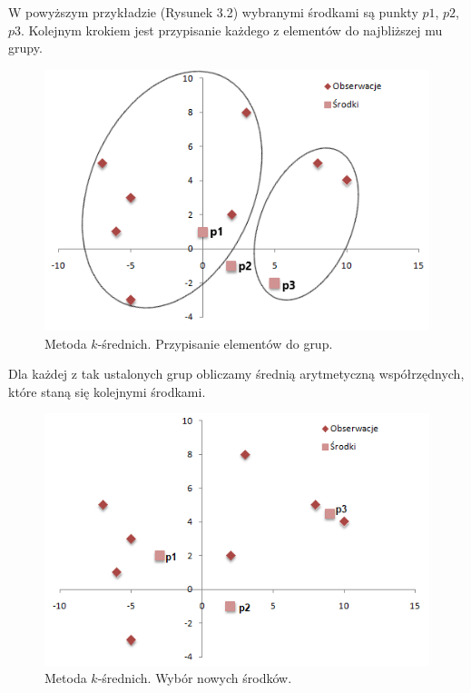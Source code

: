 \documentclass[12pt,a4paper]{report}
\begin{document}
W powyższym przykładzie (Rysunek 3.2) wybranymi środkami są punkty $p1$, $p2$, $p3$. Kolejnym krokiem jest przypisanie każdego z elementów do najbliższej mu grupy.
\begin{center}
\begin{figure}[H]
\centering
\includegraphics[scale=0.8]{ks_1.png} 
\caption{Metoda $k$-średnich. Przypisanie elementów do grup.}
\end{figure}
\end{center}
Dla każdej z tak ustalonych grup obliczamy średnią arytmetyczną współrzędnych, które staną się kolejnymi środkami.
\begin{center}
\begin{figure}[H]
\centering
\includegraphics[scale=0.8]{ks_2.png} 
\caption{Metoda $k$-średnich. Wybór nowych środków.}
\end{figure}
\end{center}
\end{document}
